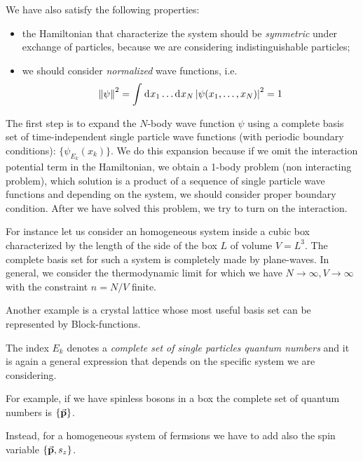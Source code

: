 \documentclass[../main/main.tex]{subfiles}
\begin{document}
We have also satisfy the following properties:
\begin{itemize}
\item the Hamiltonian that characterize the system should be \emph{symmetric} under exchange of particles, because we are considering indistinguishable particles;
\item we should consider \emph{normalized} wave functions, i.e.
\begin{equation}
  \norm{\psi }^2 = \int_{}^{} \dd[]{x_1} \dots \dd[]{x_N} \abs{\psi (x_1,\dots,x_N)}^2 = 1
\end{equation}
\end{itemize}

The first step is to expand the \( N \)-body wave function \( \psi  \) using a complete basis set of time-independent single particle wave functions (with periodic boundary conditions): \( \{ \psi_{E_k} (x_k) \}   \). We do this expansion because if we omit the interaction potential term in the Hamiltonian, we obtain a 1-body problem (non interacting problem), which solution is a product of a sequence of single particle wave functions and depending on the system, we should consider proper boundary condition. After we have solved this problem, we try to turn on the interaction.
\begin{example}{}{}
For instance let us consider an homogeneous system inside a cubic box characterized by the length of the side of the box \( L \) of volume \( V=L^3 \). The complete basis set for such a system is completely made by plane-waves. In general, we consider the thermodynamic limit for which we have \( N \rightarrow \infty, V \rightarrow \infty   \) with the constraint \( n = N/V \) finite.

Another example is a crystal lattice whose most useful basis set can be represented by Block-functions.
\end{example}

The index \( E_k \) denotes a \emph{complete set of single particles quantum numbers} and it is again a general expression that depends on the specific system we are considering.
\begin{example}{}{}
For example, if we have spinless bosons in a box the complete set of quantum numbers is \( \{ \va{p} \}   \).

Instead, for a homogeneous system of fermsions we have to add also the spin variable \( \{ \va{p},s_z \}   \).
\end{example}
\end{document}
